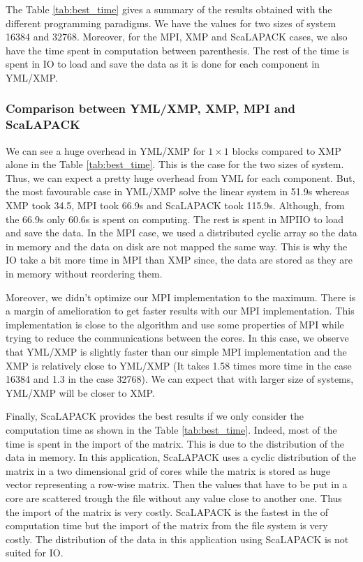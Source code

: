 The Table \ref{tab:best_time} gives a summary of the results obtained with the different programming paradigms.
We have the values for two sizes of system 16384 and 32768.
Moreover, for the MPI, XMP and ScaLAPACK cases, we also have the time spent in computation between parenthesis.
The rest of the time is spent in IO to load and save the data as it is done for each component in YML/XMP.

\subsubsection{Comparison between YML/XMP, XMP, MPI and ScaLAPACK}

We can see a huge overhead in YML/XMP for $1 \times 1$ blocks compared to XMP alone in the Table \ref{tab:best_time}.
This is the case for the two sizes of system.
Thus, we can expect a pretty huge overhead from YML for each component.
But, the most favourable case in YML/XMP solve the linear system in 51.9s whereas XMP took 34.5, MPI took 66.9s and ScaLAPACK took 115.9s.
Although, from the 66.9s only 60.6s is spent on computing.
The rest is spent in MPIIO to load and save the data.
In the MPI case, we used a distributed cyclic array so the data in memory and the data on disk are not mapped the same way.
This is why the IO take a bit more time in MPI than XMP since, the data are stored as they are in memory without reordering them.

Moreover, we didn't optimize our MPI implementation to the maximum.
There is a margin of amelioration to get faster results with our MPI implementation.
This implementation is close to the algorithm and use some properties of MPI while trying to reduce the communications between the cores.
In this case, we observe that YML/XMP is slightly faster than our simple MPI implementation and the XMP is relatively close to YML/XMP (It takes 1.58 times more time in the case 16384 and 1.3 in the case 32768).
We can expect that with larger size of systems, YML/XMP will be closer to XMP.

Finally, ScaLAPACK provides the best results if we only consider the computation time as shown in the Table \ref{tab:best_time}.
Indeed, most of the time is spent in the import of the matrix.
This is due to the distribution of the data in memory.
In this application, ScaLAPACK uses a cyclic distribution of the matrix in a two dimensional grid of cores while the matrix is stored as huge vector representing a row-wise matrix.
Then the values that have to be put in a core are scattered trough the file without any value close to another one.
Thus the import of the matrix is very costly.
ScaLAPACK is the fastest in the of computation time but the import of the matrix from the file system is very costly.
The distribution of the data in this application using ScaLAPACK is not suited for IO.

